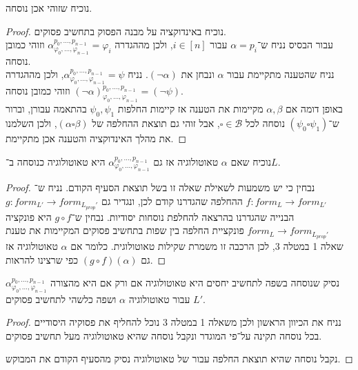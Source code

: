 \subquestion{}
נוכיח שזוהי אכן נוסחה.
\begin{proof}
	נוכיח באינדוקציה על מבנה הפסוק בתחשיב פסוקים. \\
	עבור הבסיס נניח ש־$\alpha = p_i$ עבור $i \in [n]$, ולכן מההגדרה $\alpha_{\varphi_0, \dots, \varphi_{n - 1}}^{p_0, \dots, p_{n - 1}} = \varphi_i$ וזוהי כמובן נוסחה. \\
	נניח שהטענה מתקיימת עבור $\alpha$ ונבחן את $(\lnot \alpha)$. נניח $\alpha_{\varphi_0, \dots, \varphi_{n - 1}}^{p_0, \dots, p_{n - 1}} = \psi$,
	ולכן מההגדרה ${(\lnot \alpha)}_{\varphi_0, \dots, \varphi_{n - 1}}^{p_0, \dots, p_{n - 1}} = (\lnot \psi)$ וזוהי כמובן נוסחה. \\
	באופן דומה אם $\alpha, \beta$ מקיימות את הטענה אז קיימות החלפות $\psi_0, \psi_1$ בהתאמה עבורן, וברור ש־$(\psi_0 \square \psi_1)$ נוסחה לכל $\square \in \mathcal{B}$,
	אבל זוהי גם תוצאת ההחלפה של $(\alpha \square \beta)$, ולכן השלמנו את מהלך האינדוקציה והטענה אכן מתקיימת.
\end{proof}

\subquestion{}
נוכיח שאם $\alpha$ טאוטולוגיה אז גם $\alpha_{\varphi_0, \dots, \varphi_{n - 1}}^{p_0, \dots, p_{n - 1}}$ היא טאוטולוגיה כנוסחה ב־$L$.
\begin{proof}
	נבחין כי יש משמעות לשאילת שאלה זו בשל תוצאת הסעיף הקודם.
	נניח ש־$f : form_L \to form_{L'}$ ההחלפה שהגדרנו קודם לכן, ונגדיר גם $g : form_{L'} \to form_{L_{prop}'}$ הבנייה שהגדרנו בהרצאה להחלפת נוסחות יסודיות.
	נבחין ש־$g \circ f$ היא פונקציה $form_L \to form_{L_{prop}'}$ פונקציית החלפה בין שפות בתחשיב פסוקים המקיימות את טענת שאלה 1 במטלה 3, לכן הרכבה זו משמרת שקילות טאוטולוגית.
	כלומר אם $\alpha$ טאוטולוגיה אז גם $(g \circ f)(\alpha)$ כפי שרצינו להראות.
\end{proof}

\subquestion{}
נסיק שנוסחה בשפה לתחשיב יחסים היא טאוטולוגיה אם ורק אם היא מהצורה $\alpha_{\varphi_0, \dots, \varphi_{n - 1}}^{p_0, \dots, p_{n - 1}}$ עבור טאוטולוגיה $\alpha$ ושפה כלשהי לתחשיב פסוקים $L'$.
\begin{proof}
	נניח את הכיוון הראשון ולכן משאלה 1 במטלה 3 נוכל להחליף את פסוקיה היסודיים בכל נוסחה תקינה על־פי המוגדר ונקבל נוסחה שהיא טאוטולוגיה מעל תחשיב פסוקים.

	נקבל נוסחה שהיא תוצאת החלפה עבור של טאוטולוגיה נסיק מהסעיף הקודם את המבוקש.
\end{proof}

